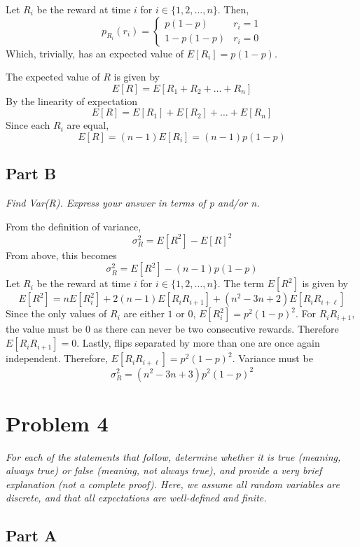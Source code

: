 \documentclass{article}
\begin{document}
Let $ R_i $ be the reward at time $ i $ for $ i \in \{ 1, 2, \ldots, n \} $.
Then,
$$ p_{R_i}(r_i) = \begin{cases}
    p(1 - p) & r_i = 1 \\
    1 - p(1 - p) & r_i = 0
\end{cases} $$
Which, trivially, has an expected value of $ E[R_i] = p(1 - p) $.

The expected value of $ R $ is given by
$$ E[R] = E[R_1 + R_2 + \ldots + R_n] $$
By the linearity of expectation
$$ E[R] = E[R_1] + E[R_2] + \ldots + E[R_n] $$
Since each $ R_i $ are equal,
$$ E[R] = (n - 1) E[R_i] = (n - 1) p (1 - p) $$

\subsection*{Part B}

\textit{Find Var(R). Express your answer in terms of p and/or n.}

\bigbreak

From the definition of variance,
$$ \sigma_R^2 = E[R^2] - E[R]^2 $$
From above, this becomes
$$ \sigma_R^2 = E[R^2] - (n - 1) p (1 - p) $$
Let $ R_i $ be the reward at time $ i $ for $ i \in \{ 1, 2, \ldots, n \} $.
The term $ E[R^2] $ is given by
$$ E[R^2] = n E[R_i^2] + 2(n - 1) E[R_i R_{i + 1}] + (n^2 - 3n + 2) E[R_i
R_{i + \ell}] $$
Since the only values of $ R_i $ are either $ 1 $ or $ 0 $, $ E[R_i^2] =
p^2(1 - p)^2 $. For $ R_i R_{i + 1} $, the value must be $ 0 $ as there can
never be two consecutive rewards. Therefore $ E[R_i R_{i + 1}] = 0 $. Lastly,
flips separated by more than one are once again independent. Therefore, $
E[R_i R_{i + \ell}] = p^2(1 - p)^2 $. Variance must be
$$ \sigma_R^2 = (n^2 - 3n + 3) p^2 (1 - p)^2 $$

\section*{Problem 4}

\textit{ For each of the statements that follow, determine whether it is true
(meaning, always true) or false (meaning, not always true), and provide a
very brief explanation (not a complete proof). Here, we assume all random
variables are discrete, and that all expectations are well-defined and
finite. }

\subsection*{Part A}
\end{document}
